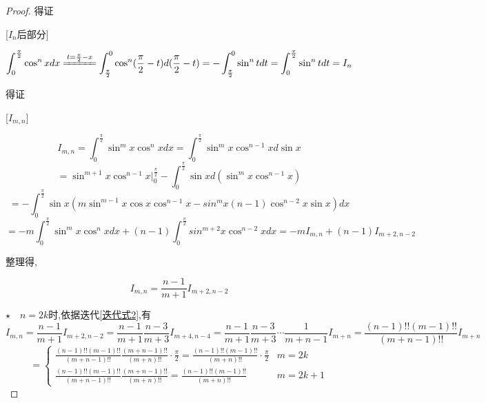 \begin{proof}
    得证

    [$I_n$后部分]

    \begin{equation*}
        \int_{0}^{\frac{\pi}{2}} \cos^n xdx
        \xlongequal{t=\frac{\pi}{2}-x}
        \int_{\frac{\pi}{2}}^{0}\cos^n (\frac{\pi}{2}-t)d(\frac{\pi}{2}-t) = - \int_{\frac{\pi}{2}}^{0}\sin^n tdt
        = \int_{0}^{\frac{\pi}{2}} \sin^n tdt =I_n 
    \end{equation*}

    得证

    [$I_{m,n}$]

    \begin{equation*}
        I_{m,n} = \int_{0}^{\frac{\pi}{2}}\sin^m x \cos^n xdx
        = \int_{0}^{\frac{\pi}{2}}\sin^m x \cos^{n-1} xd \sin x
    \end{equation*}
    \begin{equation*}
        = \sin^{m+1} x \cos^{n-1} x |_{0}^{\frac{\pi}{2}}-
        \int_{0}^{\frac{\pi}{2}}\sin x d (\sin^m x \cos^{n-1}x) 
    \end{equation*}
    \begin{equation*}
        =-\int_{0}^{\frac{\pi}{2}}\sin x  (m\sin^{m-1}x \cos x \cos^{n-1}x - sin^m x (n-1)\cos^{n-2} x \sin x) dx
    \end{equation*}
    \begin{equation*}
        =-m\int_{0}^{\frac{\pi}{2}}\sin^m x \cos^{n}xdx +(n-1) \int_{0}^{\frac{\pi}{2}} sin^{m+2} x \cos^{n-2} x dx
        = -m I_{m,n}+(n-1)I_{m+2,n-2}
    \end{equation*}

    整理得,

    \begin{equation}
        I_{m,n} = \frac{n-1}{m+1} I_{m+2,n-2}   \label{迭代式2}
    \end{equation}

    \vspace{8pt}
    $\star \quad n=2k$时,依据迭代\cref{迭代式2},有
    \begin{equation*}
        I_{m,n}=\frac{n-1}{m+1} I_{m+2,n-2}
        = \frac{n-1}{m+1} \frac{n-3}{m+3} I_{m+4,n-4}
        = \frac{n-1}{m+1} \frac{n-3}{m+3}\cdots \frac{1}{m+n-1} I_{m+n}
        = \frac{(n-1)!!(m-1)!!}{(m+n-1)!!} I_{m+n}
    \end{equation*}
    \begin{equation}
        =
        \begin{cases}
            \frac{(n-1)!!(m-1)!!}{(m+n-1)!!} \frac{(m+n-1)!!}{(m+n)!!} \cdot \frac{\pi}{2}=\frac{(n-1)!!(m-1)!!}{(m+n)!!} \cdot \frac{\pi}{2}& m=2k\\
            \frac{(n-1)!!(m-1)!!}{(m+n-1)!!} \frac{(m+n-1)!!}{(m+n)!!} = \frac{(n-1)!!(m-1)!!}{(m+n)!!} & m=2k+1 \label{1.38}
        \end{cases}
    \end{equation}


\end{proof}
